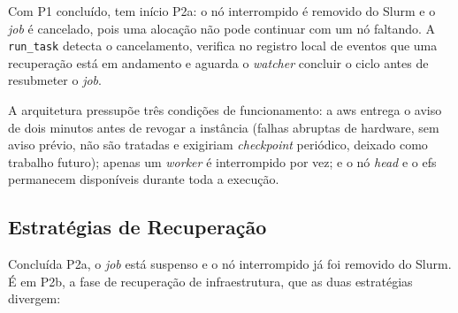 \documentclass[a4paper,11pt]{article}
\begin{document}
            Com P1 concluído, tem início P2a: o nó interrompido é removido do Slurm
            e o \textit{job} é cancelado, pois uma alocação não pode continuar com um
            nó faltando. A \texttt{run\_task} detecta o cancelamento, verifica no
            registro local de eventos que uma recuperação está em andamento e aguarda
            o \textit{watcher} concluir o ciclo antes de resubmeter o \textit{job}.

            A arquitetura pressupõe três condições de funcionamento: a \gls{aws}
            entrega o aviso de dois minutos antes de revogar a instância (falhas abruptas
            de hardware, sem aviso prévio, não são tratadas e exigiriam
            \textit{checkpoint} periódico, deixado como trabalho futuro); apenas um
            \textit{worker} é interrompido por vez; e o nó \textit{head} e o \gls{efs}
            permanecem disponíveis durante toda a execução.

        \subsection{Estratégias de Recuperação}
        \label{sec:strategies}

            Concluída P2a, o \textit{job} está suspenso e o nó interrompido já foi
            removido do Slurm. É em P2b, a fase de recuperação de infraestrutura, que
            as duas estratégias divergem:
\end{document}

